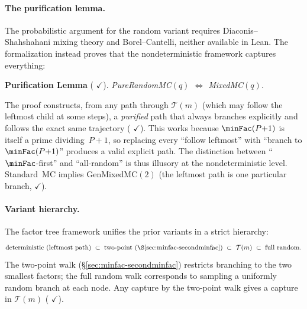 \paragraph{The purification lemma.}
The probabilistic argument for the random variant requires
Diaconis--Shahshahani mixing theory and Borel--Cantelli, neither
available in Lean.  The formalization instead proves that the
nondeterministic framework captures everything:

\smallskip\noindent
\textbf{Purification Lemma}
(
{\color{leanink}$\checkmark$}).
\emph{PureRandomMC$(q)$ $\Leftrightarrow$ MixedMC$(q)$.}

\smallskip\noindent
The proof constructs, from any path through $\mathcal{T}(m)$ (which
may follow the leftmost child at some steps), a
\emph{purified} path that always branches explicitly and follows the
exact same trajectory
(
{\color{leanink}$\checkmark$}).
This works because $\minFac(P{+}1)$ is itself a prime dividing~$P{+}1$,
so replacing every ``follow leftmost'' with ``branch to
$\minFac(P{+}1)$'' produces a valid explicit path.
The distinction between ``$\minFac$-first'' and
``all-random'' is thus illusory at the nondeterministic level.
Standard~MC implies GenMixedMC$(2)$ (the leftmost path is one
particular branch,
{\color{leanink}$\checkmark$}).

\paragraph{Variant hierarchy.}
The factor tree framework unifies the prior variants in a strict
hierarchy:
\[
  \text{deterministic } (\text{leftmost path})
  \;\subset\;
  \text{two-point } (\S\ref{sec:minfac-secondminfac})
  \;\subset\;
  \mathcal{T}(m)
  \;\subset\;
  \text{full random.}
\]
The two-point walk (\S\ref{sec:minfac-secondminfac}) restricts
branching to the two smallest factors; the full random walk
corresponds to sampling a uniformly random branch at each node.
Any capture by the two-point walk gives a capture in $\mathcal{T}(m)$
(
{\color{leanink}$\checkmark$}).

